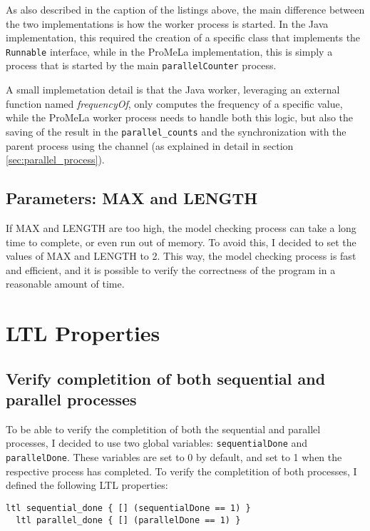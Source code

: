 \documentclass[a4paper, 11pt]{article}
\begin{document}
As also described in the caption of the listings above, the main difference between the two implementations is how the worker process is started. In the Java implementation, this required the creation of a specific class that implements the \texttt{Runnable} interface, while in the ProMeLa implementation, this is simply a process that is started by the main \texttt{parallelCounter} process.

A small implemetation detail is that the Java worker, leveraging an external function named \textit{frequencyOf}, only computes the frequency of a specific value, while the ProMeLa worker process needs to handle both this logic, but also the saving of the result in the \texttt{parallel\_counts} and the synchronization with the parent process using the channel (as explained in detail in section \ref{sec:parallel_process}).

\subsection{Parameters: MAX and LENGTH}

If MAX and LENGTH are too high, the model checking process can take a long time to complete, or even run out of memory. To avoid this, I decided to set the values of MAX and LENGTH to 2. This way, the model checking process is fast and efficient, and it is possible to verify the correctness of the program in a reasonable amount of time.

\pagebreak

\section{LTL Properties}
\label{sec:ltl_properties}

\subsection{Verify completition of both sequential and parallel processes}

To be able to verify the completition of both the sequential and parallel processes, I decided to use two global variables: \texttt{sequentialDone} and \texttt{parallelDone}. These variables are set to 0 by default, and set to 1 when the respective process has completed. To verify the completition of both processes, I defined the following LTL properties:

\begin{lstlisting}[language=Promela, caption={LTL properties to verify the completition of both sequential and parallel processes}, captionpos=b, breaklines=true, label={lst:ltl_properties}]
  ltl sequential_done { [] (sequentialDone == 1) }
  ltl parallel_done { [] (parallelDone == 1) }
\end{lstlisting}
\end{document}
